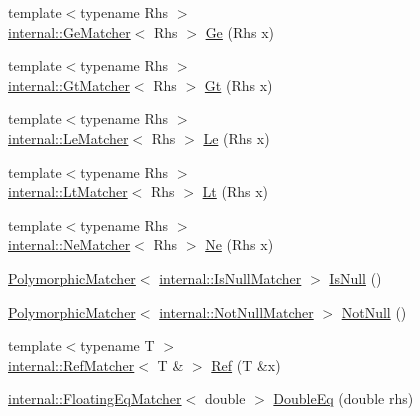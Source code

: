 \begin{DoxyCompactItemize}
\item 
{\footnotesize template$<$typename Rhs $>$ }\\\hyperlink{classtesting_1_1internal_1_1GeMatcher}{internal\+::\+Ge\+Matcher}$<$ Rhs $>$ \hyperlink{namespacetesting_a42bb19b42d7830b972973a103d5e00f2}{Ge} (Rhs x)
\item 
{\footnotesize template$<$typename Rhs $>$ }\\\hyperlink{classtesting_1_1internal_1_1GtMatcher}{internal\+::\+Gt\+Matcher}$<$ Rhs $>$ \hyperlink{namespacetesting_a493fc1bafd7b3945ba06ace80e74b0d5}{Gt} (Rhs x)
\item 
{\footnotesize template$<$typename Rhs $>$ }\\\hyperlink{classtesting_1_1internal_1_1LeMatcher}{internal\+::\+Le\+Matcher}$<$ Rhs $>$ \hyperlink{namespacetesting_a2e33596921b80a7fdaff3f62bf18a478}{Le} (Rhs x)
\item 
{\footnotesize template$<$typename Rhs $>$ }\\\hyperlink{classtesting_1_1internal_1_1LtMatcher}{internal\+::\+Lt\+Matcher}$<$ Rhs $>$ \hyperlink{namespacetesting_ad621459957a8bcdd3c256b7940ecbf99}{Lt} (Rhs x)
\item 
{\footnotesize template$<$typename Rhs $>$ }\\\hyperlink{classtesting_1_1internal_1_1NeMatcher}{internal\+::\+Ne\+Matcher}$<$ Rhs $>$ \hyperlink{namespacetesting_afe42d41d5171234cb9da5da27faeb7e8}{Ne} (Rhs x)
\item 
\hyperlink{classtesting_1_1PolymorphicMatcher}{Polymorphic\+Matcher}$<$ \hyperlink{classtesting_1_1internal_1_1IsNullMatcher}{internal\+::\+Is\+Null\+Matcher} $>$ \hyperlink{namespacetesting_a56ffb1a169c14ce585fc5bed32add2db}{Is\+Null} ()
\item 
\hyperlink{classtesting_1_1PolymorphicMatcher}{Polymorphic\+Matcher}$<$ \hyperlink{classtesting_1_1internal_1_1NotNullMatcher}{internal\+::\+Not\+Null\+Matcher} $>$ \hyperlink{namespacetesting_a39d1f92b53b8b2a0b6db6a22ac146416}{Not\+Null} ()
\item 
{\footnotesize template$<$typename T $>$ }\\\hyperlink{classtesting_1_1internal_1_1RefMatcher}{internal\+::\+Ref\+Matcher}$<$ T \& $>$ \hyperlink{namespacetesting_a0a4a364121ea3fa656a112f1c2e6b7a4}{Ref} (T \&x)
\item 
\hyperlink{classtesting_1_1internal_1_1FloatingEqMatcher}{internal\+::\+Floating\+Eq\+Matcher}$<$ double $>$ \hyperlink{namespacetesting_a1f49f9d97f03bfa4db26888f03486a9f}{Double\+Eq} (double rhs)
\item 

\end{DoxyCompactItemize}
